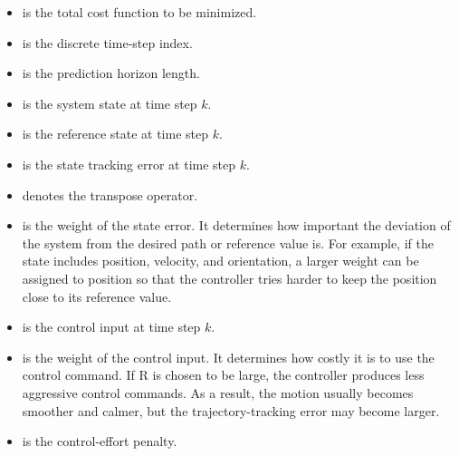 \documentclass[a4paper]{article}
\begin{document}
        \begin{itemize}
            \item[$J$] is the total cost function to be minimized.
            \item[$k$] is the discrete time-step index.
            \item[$N$] is the prediction horizon length.
            \item[$x_k$] is the system state at time step $k$.
            \item[$x_k^{\mathrm{ref}}$] is the reference state at time step $k$.
            \item[$x_k - x_k^{\mathrm{ref}}$] is the state tracking error at time step $k$.
            \item[$(\cdot)^T$] denotes the transpose operator.
            \item[$Q$] is the weight of the state error. It determines how important the deviation of the system from the desired path or reference value is. For example, if the state includes position, velocity, and orientation, a larger weight can be assigned to position so that the controller tries harder to keep the position close to its reference value.
            \item[$u_k$] is the control input at time step $k$.
            \item[$R$] is the weight of the control input. It determines how costly it is to use the control command. If R is chosen to be large, the controller produces less aggressive control commands. As a result, the motion usually becomes smoother and calmer, but the trajectory-tracking error may become larger.
            \item[$u_k^T R u_k$] is the control-effort penalty.
        \end{itemize}
\end{document}
